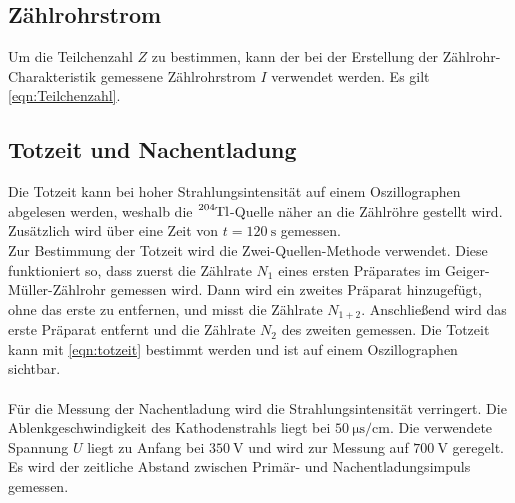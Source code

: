  \subsection{Zählrohrstrom}

    Um die Teilchenzahl $Z$ zu bestimmen, kann der bei der Erstellung der Zählrohr-Charakteristik
    gemessene Zählrohrstrom $I$ verwendet werden.
    Es gilt \autoref{eqn:Teilchenzahl}.

\subsection{Totzeit und Nachentladung}

    Die Totzeit kann bei hoher Strahlungsintensität auf einem Oszillographen abgelesen werden,
    weshalb die $\ce{^204Tl}$-Quelle näher an die Zählröhre gestellt wird.
    Zusätzlich wird über eine Zeit von $t = \SI{120}{\second}$ gemessen. \\
    Zur Bestimmung der Totzeit wird die Zwei-Quellen-Methode verwendet.
    Diese funktioniert so, dass zuerst die Zählrate $N_1$ eines ersten Präparates im
    Geiger-Müller-Zählrohr gemessen wird.
    Dann wird ein zweites Präparat hinzugefügt, ohne das erste zu entfernen,
    und misst die Zählrate $N_{1+2}$.
    Anschließend wird das erste Präparat entfernt und die Zählrate $N_2$ des zweiten
    gemessen.
    Die Totzeit kann mit \autoref{eqn:totzeit} bestimmt werden und ist auf
    einem Oszillographen sichtbar.\\
    \\
    Für die Messung der Nachentladung wird die Strahlungsintensität verringert.
    Die Ablenkgeschwindigkeit des Kathodenstrahls liegt bei $\SI{50}{\micro\second\per\centi\meter}$.
    Die verwendete Spannung $U$ liegt zu Anfang bei $\SI{350}{\volt}$ und wird zur Messung auf
    $\SI{700}{\volt}$ geregelt. Es wird der zeitliche Abstand zwischen Primär- und Nachentladungsimpuls
    gemessen.









